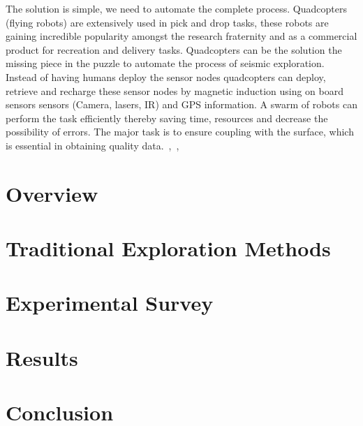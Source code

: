 \documentclass[conference]{IEEEtran}
\newcommand{\todo}[1]{\vspace{5 mm}\par \noindent \framebox{\begin{minipage}[c]{0.98 \columnwidth} \ttfamily\flushleft \textcolor{red}{#1}\end{minipage}}\vspace{5 mm}\par}
\begin{document}
The solution is simple, we need to automate the complete process. Quadcopters (flying robots) are extensively used in pick and drop tasks, these robots are gaining incredible popularity amongst the research fraternity and as a commercial product for recreation and delivery tasks. Quadcopters can be the solution the missing piece in the puzzle to automate the process of seismic exploration. Instead of having humans deploy the sensor nodes quadcopters can deploy, retrieve and recharge these sensor nodes by magnetic induction using on board sensors sensors (Camera, lasers, IR) and GPS information. A swarm of robots can perform the task efficiently thereby saving time, resources and decrease the possibility of errors. The major task is to ensure coupling with the surface, which is essential in obtaining quality data.~\cite{MVEwaWSN05},~\cite{CtMiSD08},~\cite{DSSMaA14} 


\section{Overview}
\todo{add some outline sentences here.  what will you talk about?}

\section{Traditional Exploration Methods}
 
\todo{cite the book that Li sent us.  Also cite some papers by Rob.}

\section{Experimental Survey}

\todo{list your experiments that you've done so far and the ones we plan to do.  Please call Li on Monday and attempt to set up an experiment}

\section{Results}



\section{Conclusion}




\end{document}
